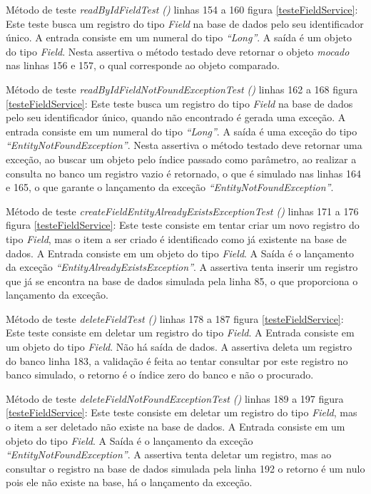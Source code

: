 Método de teste \textit{ readByIdFieldTest ()} linhas 154 a 160 figura \ref{testeFieldService}: Este teste busca um registro do tipo \textit{Field} na base de dados pelo seu identificador único. A entrada consiste em um numeral do tipo \textit{“Long”}. A saída é um objeto do tipo \textit{Field}. Nesta assertiva o método testado deve retornar o objeto \textit{mocado} nas linhas 156 e 157, o qual corresponde ao objeto comparado.

Método de teste \textit{ readByIdFieldNotFoundExceptionTest ()} linhas 162 a 168 figura \ref{testeFieldService}: Este teste busca um registro do tipo \textit{Field} na base de dados pelo seu identificador único, quando não encontrado é gerada uma exceção. A entrada consiste em um numeral do tipo \textit{“Long”}. A saída é uma exceção do tipo \textit{“EntityNotFoundException”}. Nesta assertiva o método testado deve retornar uma exceção, ao buscar um objeto pelo índice passado como parâmetro, ao realizar a consulta no banco um registro vazio é retornado, o que é simulado nas linhas 164 e 165, o que garante o lançamento da exceção \textit{“EntityNotFoundException”}.


Método de teste \textit{ createFieldEntityAlreadyExistsExceptionTest ()} linhas 171 a 176 figura \ref{testeFieldService}:  Este teste consiste em tentar criar um novo registro do tipo \textit{Field}, mas o item a ser criado é identificado como já existente na base de dados. A Entrada consiste em um objeto do tipo \textit{Field}. A Saída é o lançamento da exceção \textit{“EntityAlreadyExistsException”}. A assertiva tenta inserir um registro que já se encontra na base de dados simulada pela linha 85, o que proporciona o lançamento da exceção.  

Método de teste \textit{ deleteFieldTest ()} linhas 178 a 187 figura \ref{testeFieldService}: Este teste consiste em deletar um registro do tipo \textit{Field}. A Entrada consiste em um objeto do tipo \textit{Field}. Não há saída de dados.  A assertiva deleta um registro do banco linha 183, a validação é feita ao tentar consultar por este registro no banco simulado, o retorno é o índice zero do banco e não o procurado.  

Método de teste \textit{ deleteFieldNotFoundExceptionTest ()} linhas 189 a 197 figura \ref{testeFieldService}: Este teste consiste em deletar um registro do tipo \textit{Field}, mas o item a ser deletado não existe na base de dados. A Entrada consiste em um objeto do tipo \textit{Field}. A Saída é o lançamento da exceção \textit{“EntityNotFoundException”}. A assertiva tenta deletar um registro, mas ao consultar o registro na base de dados simulada pela linha 192 o retorno é um nulo pois ele não existe na base, há o lançamento da exceção.  


